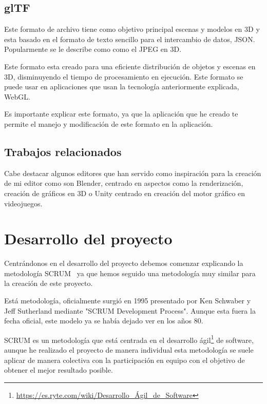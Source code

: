 \documentclass[a4paper, 12pt]{book}
\begin{document}
\section{glTF} %
\label{sec:Gltfs}
Este formato de archivo tiene como objetivo principal escenas y modelos en 3D y esta basado en el formato de texto sencillo para el intercambio de datos, JSON. Popularmente se le describe como como el JPEG en 3D.

Este formato esta creado para una eficiente distribución de objetos y escenas en 3D, disminuyendo el tiempo de procesamiento en ejecución. Este formato se puede usar en aplicaciones que usan la tecnología anteriormente explicada, WebGL.

Es importante explicar este formato, ya que la aplicación que he creado te permite el manejo y  modificación de este formato en la aplicación.

\section{Trabajos relacionados} %
\label{sec:Otros}
Cabe destacar algunos editores que han servido como inspiración para la creación de mi editor como son Blender, centrado en aspectos como la renderización, creación de gráficos en 3D o Unity centrado en creación del motor gráfico en videojuegos. 


\cleardoublepage
\chapter{Desarrollo del proyecto}
\label{chap:Desarrollo del proyecto}
Centrándonos en el desarrollo del proyecto debemos comenzar explicando la metodología SCRUM~\cite{proyectos} ya que hemos seguido una metodología muy similar para la creación de este proyecto.

Está metodología, oficialmente surgió en 1995 presentado por Ken Schwaber y Jeff Sutherland mediante "SCRUM Development Process". Aunque esta fuera la fecha oficial, este modelo ya se había dejado ver en los años 80.

SCRUM es un metodología que está centrada en el desarrollo ágil\footnote{\url{https://es.ryte.com/wiki/Desarrollo_Ágil_de_Software}}  de software, aunque he realizado el proyecto de manera individual esta metodología se suele aplicar de manera colectiva con la participación en equipo con el objetivo de obtener el mejor resultado posible.
\end{document}
